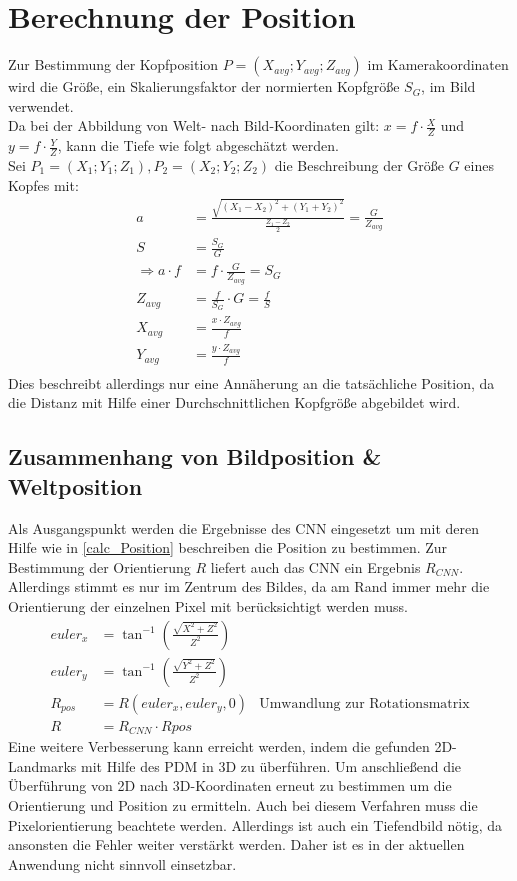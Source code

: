 \section{Berechnung der Position}
\label{calc_Position}
Zur Bestimmung der Kopfposition $P=(X_{avg};Y_{avg};Z_{avg})$ im Kamerakoordinaten wird die Größe, ein Skalierungsfaktor der normierten Kopfgröße $S_G$, im Bild verwendet.\\
Da bei der Abbildung von Welt- nach Bild-Koordinaten gilt: $x=f\cdot \frac{X}{Z}$ und $ y=f\cdot \frac{Y}{Z}$, kann die Tiefe wie folgt abgeschätzt werden.\\
Sei $P_1 = (X_1;Y_1;Z_1), P_2=(X_2;Y_2;Z_2)$ die Beschreibung der Größe $G$ eines Kopfes mit:\\
\begin{align*}
a &= \frac{\sqrt{(X_1-X_2)^2+(Y_1+Y_2)^2}}{\frac{Z_1-Z_2}{2}} =\frac{G}{Z_{avg}}\\
S &= \frac{S_G}{G}\\
\Rightarrow a\cdot f &= f\cdot\frac{G}{Z_{avg}} = S_G\\
Z_{avg} &= \frac{f}{S_G}\cdot G = \frac{f}{S}\\
X_{avg} &= \frac{x \cdot Z_{avg}}{f}\\
Y_{avg} &= \frac{y \cdot Z_{avg}}{f}\\
\end{align*}
Dies beschreibt allerdings nur eine Annäherung an die tatsächliche Position, da die Distanz mit Hilfe einer Durchschnittlichen Kopfgröße abgebildet wird.
\subsection{Zusammenhang von Bildposition \& Weltposition}
Als Ausgangspunkt werden die Ergebnisse des CNN eingesetzt um mit deren Hilfe wie in \autoref{calc_Position} beschreiben die Position zu bestimmen. Zur Bestimmung der Orientierung $R$ liefert auch das CNN ein Ergebnis $R_{CNN}$. Allerdings stimmt es nur im Zentrum des Bildes, da am Rand immer mehr die Orientierung der einzelnen Pixel mit berücksichtigt werden muss.\\
\begin{align*}
euler_x &= \tan^{-1}(\frac{\sqrt{X^2+Z^2}}{Z^2})\\
euler_y &= \tan^{-1}(\frac{\sqrt{Y^2+Z^2}}{Z^2})\\
R_{pos} &= R(euler_x,euler_y,0)&\text{Umwandlung zur Rotationsmatrix}\\
R &= R_{CNN}\cdot R{pos}
\end{align*}
Eine weitere Verbesserung kann erreicht werden, indem die gefunden 2D-Landmarks mit Hilfe des PDM in 3D zu überführen. Um anschließend die Überführung von 2D nach 3D-Koordinaten erneut zu bestimmen um die Orientierung und Position zu ermitteln. Auch bei diesem Verfahren muss die Pixelorientierung beachtete werden. Allerdings ist auch ein Tiefendbild nötig, da ansonsten die Fehler weiter verstärkt werden. Daher ist es in der aktuellen Anwendung nicht sinnvoll einsetzbar.